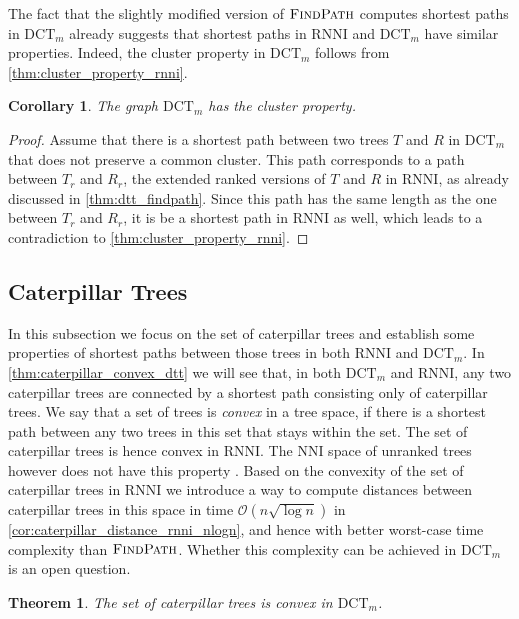 \documentclass[11pt]{amsart}
\newtheorem{theorem}{Theorem}
\newtheorem{corollary}{Corollary}
\newcommand{\rnni}{\mathrm{RNNI}}
\newcommand{\findpath}{\textsc{FindPath}}
\newcommand{\nni}{\mathrm{NNI}}
\newcommand{\dtt}{\mathrm{DCT}}
\renewcommand{\O}{\mathcal O}
\newcommand{\summary}[1]{} %
\begin{document}
The fact that the slightly modified version of $\findpath$ computes shortest paths in $\dtt_m$ already suggests that shortest paths in $\rnni$ and $\dtt_m$ have similar properties.
Indeed, the cluster property in $\dtt_m$ follows from \autoref{thm:cluster_property_rnni}.

\begin{corollary}
	The graph $\dtt_m$ has the cluster property.
\end{corollary}

\begin{proof}
	Assume that there is a shortest path between two trees $T$ and $R$ in $\dtt_m$ that does not preserve a common cluster.
	This path corresponds to a path between $T_r$ and $R_r$, the extended ranked versions of $T$ and $R$ in $\rnni$, as already discussed in \autoref{thm:dtt_findpath}.
	Since this path has the same length as the one between $T_r$ and $R_r$, it is be a shortest path in $\rnni$ as well, which leads to a contradiction to \autoref{thm:cluster_property_rnni}.
\end{proof}

\subsection{Caterpillar Trees}
\label{section:caterpillar_convex}

\summary{Defining Caterpillar trees. Why are they interesting?}
In this subsection we focus on the set of caterpillar trees and establish some properties of shortest paths between those trees in both $\rnni$ and $\dtt_m$.
In \autoref{thm:caterpillar_convex_dtt} we will see that, in both $\dtt_m$ and $\rnni$, any two caterpillar trees are connected by a shortest path consisting only of caterpillar trees.
We say that a set of trees is \emph{convex} in a tree space, if there is a shortest path between any two trees in this set that stays within the set.
The set of caterpillar trees is hence convex in $\rnni$.
The $\nni$ space of unranked trees however does not have this property \autocite{Gavryushkin2018-ol}.
Based on the convexity of the set of caterpillar trees in $\rnni$ we introduce a way to compute distances between caterpillar trees in this space in time $\O(n \sqrt{\log n})$ in \autoref{cor:caterpillar_distance_rnni_nlogn}, and hence with better worst-case time complexity than $\findpath$.
Whether this complexity can be achieved in $\dtt_m$ is an open question.

\begin{theorem}
	The set of caterpillar trees is convex in $\dtt_m$.
	\label{thm:caterpillar_convex_dtt}
\end{theorem}
\end{document}
